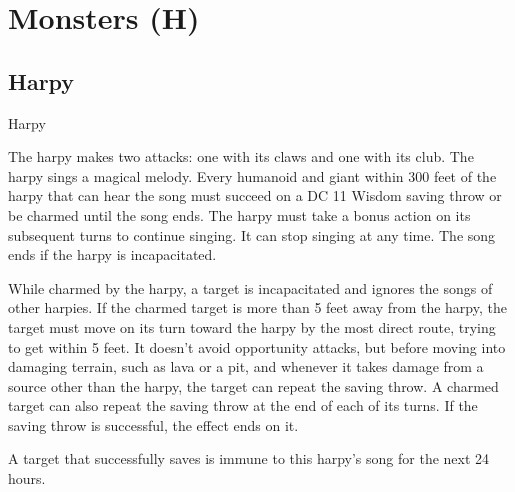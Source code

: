 \FloatBarrier
\section{Monsters (H)}\label{sec:monsters-h}

\subsection{Harpy}
\begin{DndMonster}[float*=b,width=\textwidth + 8pt]{Harpy}
\begin{multicols}{2}
\DndMonsterBasics[armor-class={11}, hit-points={38 (7d8 + 7)}, speed={20 ft., fly 40 ft.}]
\DndMonsterDetails[saving-throws={}, skills={}, damage-immunities={}, damage-resistances={}, damage-vulnerabilities={}, condition-immunities={}, senses={passive Perception 10}, languages={Common}, challenge={1 (200 XP)}]
 The harpy makes two attacks: one with its claws and one with its club.
\DndMonsterAttack[
	name=Claws,
	distance=melee,
	type=weapon,
	mod=+3,
	reach=5,
	dmg=\DndDice{2d4 + 1},
	dmg-type=slashing
]
\DndMonsterAttack[
	name=Club,
	distance=melee,
	type=weapon,
	mod=+3,
	reach=5,
	dmg=\DndDice{1d4 + 1},
	dmg-type=bludgeoning
]
The harpy sings a magical melody. Every humanoid and giant within 300 feet of the harpy that can hear the song must succeed on a DC 11 Wisdom saving throw or be charmed until the song ends. The harpy must take a bonus action on its subsequent turns to continue singing. It can stop singing at any time. The song ends if the harpy is incapacitated.

While charmed by the harpy, a target is incapacitated and ignores the songs of other harpies. If the charmed target is more than 5 feet away from the harpy, the target must move on its turn toward the harpy by the most direct route, trying to get within 5 feet. It doesn't avoid opportunity attacks, but before moving into damaging terrain, such as lava or a pit, and whenever it takes damage from a source other than the harpy, the target can repeat the saving throw. A charmed target can also repeat the saving throw at the end of each of its turns. If the saving throw is successful, the effect ends on it.

A target that successfully saves is immune to this harpy's song for the next 24 hours.
\end{multicols}
\end{DndMonster}

